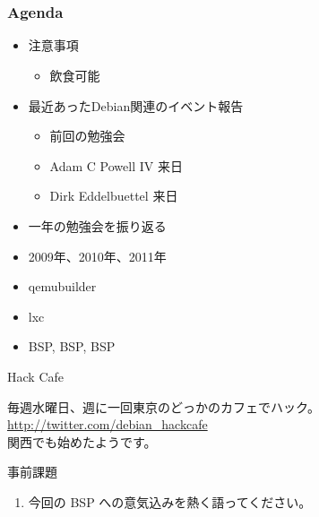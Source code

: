 \section{}
\begin{frame}
 \frametitle{Agenda}
\begin{minipage}[t]{0.45\hsize}
  \begin{itemize}
  \item 注意事項
	\begin{itemize}
	 \item 飲食可能
	\end{itemize}
  \item 最近あったDebian関連のイベント報告
	\begin{itemize}
	 \item 前回の勉強会
	 \item Adam C Powell IV 来日
	 \item Dirk Eddelbuettel 来日
	\end{itemize}
 \end{itemize}
\end{minipage} 
\begin{minipage}[t]{0.45\hsize}
 \begin{itemize}
  \item 一年の勉強会を振り返る
  \item 2009年、2010年、2011年
  \item qemubuilder
  \item lxc
  \item BSP, BSP, BSP
 \end{itemize}
\end{minipage}
\end{frame}

\begin{frame}{Hack Cafe}

毎週水曜日、週に一回東京のどっかのカフェでハック。\\
\url{http://twitter.com/debian_hackcafe}\\
関西でも始めたようです。
\end{frame}


\begin{frame}{事前課題}
\begin{enumerate}
 \item  今回の BSP への意気込みを熱く語ってください。
\end{enumerate}
\end{frame}

{\footnotesize

}

